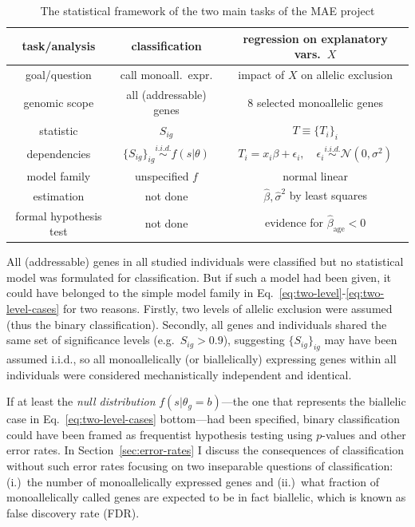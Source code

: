 \documentclass[letterpaper]{article}
\begin{document}
\begin{table}[t]
\begin{center}
\begin{tabular}{c|c|c|}
task/analysis & classification & regression on explanatory vars.~\(X\) \\
\hline
goal/question & call monoall.~expr. & impact of \(X\) on allelic exclusion \\
genomic scope & all (addressable) genes & 8 selected monoallelic genes \\
statistic & \(S_{ig}\) & \(T\equiv\{T_i\}_i\) \\
dependencies & \(\{S_{ig}\}_{ig} \overset{i.i.d.}{\sim} f(s |
\theta) \) &
\(T_{i} = x_i \beta + \epsilon_i, \quad \epsilon_i \overset{i.i.d.}{\sim}
\mathcal{N}(0, \sigma^2)\) \\
model family & unspecified \(f\) & normal linear \\
estimation & not done & \(\hat{\beta}, \hat{\sigma}^2\) by least squares \\
formal hypothesis test & not done & evidence for \(\hat{\beta}_\mathrm{age} < 0\) \\
\hline
\end{tabular}
\end{center}
\caption{The statistical framework of the two main tasks of the MAE project }
\label{tab:model-used}
\end{table}

All (addressable) genes in all studied individuals were classified but no
statistical model was formulated for classification.  But if such a model had
been given, it could have belonged to the simple model family in
Eq.~\ref{eq:two-level}-\ref{eq:two-level-cases} for two reasons.  Firstly, two
levels of allelic exclusion were assumed (thus the binary classification).
Secondly, all genes and individuals shared the same set of significance
levels (e.g.~\(S_{ig}>0.9\)), suggesting \(\{S_{ig}\}_{ig}\) may have been
assumed i.i.d., so all monoallelically (or biallelically) expressing genes
within all individuals were considered mechanistically independent and
identical.

If at least the \emph{null distribution} \(f(s|\theta_g=b)\)---the one that
represents the biallelic case in Eq.~\ref{eq:two-level-cases} bottom---had
been specified, binary classification could have been framed as frequentist
hypothesis testing using \(p\)-values and other error rates.  In
Section~\ref{sec:error-rates} I discuss the consequences of classification
without such error rates focusing on two inseparable questions of
classification: (i.)~the number of monoallelically expressed genes and
(ii.)~what fraction of monoallelically called genes are expected to be in fact
biallelic, which is known as false discovery rate (FDR).
\end{document}
